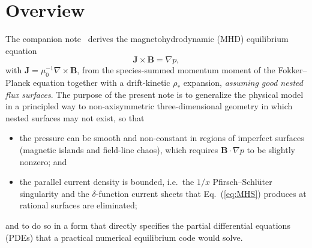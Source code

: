 \documentclass[english]{article}
\newcommand{\bB}{\mathbf{B}}
\newcommand{\bJ}{\mathbf{J}}
\begin{document}
\begin{abstract}
profile is an output, we give an interpretive form suited to the classical workflow: a
one-dimensional pressure profile, specified as a function of enclosed volume, is realized exactly
by composing it with the level-set volume function of a reference potential that solves the same
anisotropic transport equation---requiring neither a heating source nor any tuning parameter,
while preserving the small parallel pressure gradient, island flattening, and barrier-localized
structure that the transport operator enforces.
We give the model equations, boundary conditions, input functions, an iteration scheme, recovery
checks against known analytic limits, and the relation to existing approaches
(VMEC, PIES, HINT, SPEC/MRxMHD, SIESTA, the stochastic-equilibrium analysis of
Krommes and Reiman, and the statistical equilibrium model of Ruth, Burby, Sengupta, and Brown).
\end{abstract}

\section{Overview}
\label{sec:overview}

The companion note~\cite{landreman_note} derives the magnetohydrodynamic (MHD) equilibrium
equation
\begin{equation}
\bJ\times\bB=\nabla p,
\label{eq:MHS}
\end{equation}
with $\bJ=\mu_0^{-1}\nabla\times\bB$, from the species-summed momentum moment of the
Fokker--Planck equation together with a drift-kinetic $\rho_*$ expansion, \emph{assuming good
nested flux surfaces}. The purpose of the present note is to generalize the physical model in a
principled way to non-axisymmetric three-dimensional geometry in which nested surfaces may not
exist, so that
\begin{itemize}
\item the pressure can be smooth and non-constant in regions of imperfect surfaces (magnetic
islands and field-line chaos), which requires $\bB\cdot\nabla p$ to be slightly nonzero; and
\item the parallel current density is bounded, i.e.\ the $1/x$ Pfirsch--Schl\"uter singularity and
the $\delta$-function current sheets that Eq.~(\ref{eq:MHS}) produces at rational surfaces
\cite{newcomb1959,boozer1981,cary1985,loizu2015a} are eliminated;
\end{itemize}
and to do so in a form that directly specifies the partial differential equations (PDEs) that a
practical numerical equilibrium code would solve.
\end{document}
